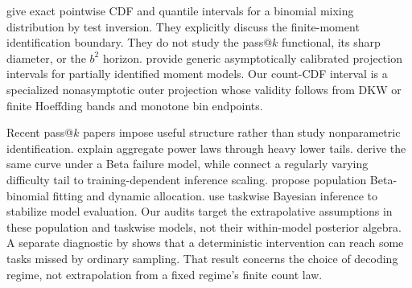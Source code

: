 \documentclass[twoside]{article}
\begin{document}
\citet{basu2026} give exact pointwise CDF and quantile intervals for a
binomial mixing distribution by test inversion. They explicitly discuss the
finite-moment identification boundary. They do not study the pass@\(k\)
functional, its sharp diameter, or the \(b^2\) horizon.
\citet{kaido2019} provide generic asymptotically calibrated projection
intervals for partially identified moment models. Our count-CDF interval is a
specialized nonasymptotic outer projection whose validity follows from DKW or
finite Hoeffding bands and monotone bin endpoints.

Recent pass@\(k\) papers impose useful structure rather than study
nonparametric identification. \citet{schaeffer2025} explain aggregate power
laws through heavy lower tails. \citet{levi2025} derive the same curve under a
Beta failure model, while \citet{levi2026} connect a regularly varying
difficulty tail to training-dependent inference scaling. \citet{kazdan2025}
propose population Beta-binomial fitting and dynamic allocation.
\citet{hariri2026} use taskwise Bayesian
inference to stabilize model evaluation. Our audits target the extrapolative
assumptions in these population and taskwise models, not their within-model
posterior algebra. A separate diagnostic by \citet{zhou2026} shows that a
deterministic intervention can reach some tasks missed by ordinary sampling.
That result concerns the choice of decoding regime, not extrapolation from a
fixed regime's finite count law.

\balance

\end{document}
